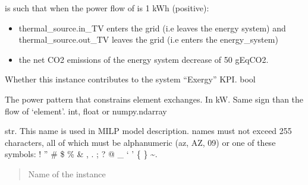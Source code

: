 \documentclass[letterpaper,10pt,english]{sphinxmanual}
\begin{document}
\begin{fulllineitems}
\begin{fulllineitems}
\sphinxAtStartPar
{} is such that when the power flow of  is 1 kWh (positive):
\begin{itemize}
\item {} 
\sphinxAtStartPar
thermal\_source.in\_TV enters the grid (i.e leaves the energy system)
and thermal\_source.out\_TV leaves the grid (i.e enters the energy\_system)

\item {} 
\sphinxAtStartPar
the net CO2 emissions of the energy system decrease of 50 gEqCO2.

\end{itemize}

\end{fulllineitems}


\begin{fulllineitems}
\label{\detokenize{generated/tamos.elementIO.Load:tamos.elementIO.Load.exergy_count}}
\pysigstartsignatures
{}
\pysigstopsignatures
\sphinxAtStartPar
Whether this instance contributes to the system “Exergy” KPI.
bool

\end{fulllineitems}


\begin{fulllineitems}
\label{\detokenize{generated/tamos.elementIO.Load:tamos.elementIO.Load.load}}
\pysigstartsignatures
{}
\pysigstopsignatures
\sphinxAtStartPar
The power pattern that constrains element exchanges.
In kW.
Same sign than the flow of ‘element’.
int, float or numpy.ndarray

\end{fulllineitems}


\begin{fulllineitems}
\label{\detokenize{generated/tamos.elementIO.Load:tamos.elementIO.Load.name}}
\pysigstartsignatures
{}
\pysigstopsignatures
\sphinxAtStartPar
str.
This name is used in MILP model description.
names must not exceed 255 characters,
all of which must be alphanumeric (a\sphinxhyphen{}z, A\sphinxhyphen{}Z, 0\sphinxhyphen{}9) or one of these symbols:
! ” \# \$ \% \& , . ; ? @ \_ ‘ ’ \{ \} \textasciitilde{}.
\begin{quote}\begin{description}
\sphinxAtStartPar
Name of the instance


\end{description}
\end{quote}
\end{fulllineitems}
\end{fulllineitems}
\end{document}
